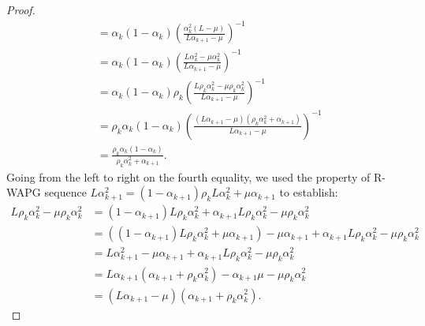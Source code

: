 \documentclass[12pt]{article}
\begin{document}
\begin{proof}
\begin{align*}
                &= 
                \alpha_k(1 - \alpha_k)
                \left(
                    \frac{\alpha_k^2(L - \mu)}{L\alpha_{k + 1} - \mu}
                \right)^{-1}
                \\
                &= \alpha_k(1 - \alpha_k)
                \left(
                    \frac{L\alpha_k^2 - \mu\alpha_k^2}{L\alpha_{k + 1} - \mu}
                \right)^{-1}
                \\
                &= 
                \alpha_k(1 - \alpha_k)
                \rho_k\left(
                    \frac{L\rho_k\alpha_k^2 - \mu\rho_k\alpha_k^2}{L\alpha_{k + 1} - \mu}
                \right)^{-1}
                \\
                &= 
                \rho_k\alpha_k(1 - \alpha_k)
                \left(
                    \frac{(L\alpha_{k + 1} - \mu)(\rho_k\alpha_k^2 + \alpha_{k + 1})}
                    {L\alpha_{k + 1} - \mu}
                \right)^{-1}
                \\
                &= \frac{\rho_k\alpha_k(1 - \alpha_k)}{\rho_k\alpha_k^2 + \alpha_{k + 1}}.
            \end{align*}
            Going from the left to right on the fourth equality, we used the property of R-WAPG sequence $L\alpha_{k + 1}^2 = (1 - \alpha_{k + 1})\rho_kL\alpha_k^2 + \mu \alpha_{k + 1}$ to establish: 
            \begin{align*}
                L \rho_k \alpha_k^2 - \mu \rho_k \alpha_k^2 
                &= 
                (1 - \alpha_{k + 1})L \rho_k \alpha_k^2 + \alpha_{k + 1} L \rho_k \alpha_k^2 - \mu \rho_k \alpha_k^2
                \\
                &= 
                ((1 - \alpha_{k + 1})L \rho_k \alpha_k^2 + \mu \alpha_{k + 1}) - \mu\alpha_{k + 1} + \alpha_{k + 1} L \rho_k \alpha_k^2 - \mu \rho_k \alpha_k^2
                \\
                &= L \alpha_{k + 1}^2 - \mu\alpha_{k + 1} + \alpha_{k + 1}L\rho_k\alpha_k^2 - \mu \rho_k \alpha_k^2
                \\
                &= 
                L\alpha_{k + 1}(\alpha_{k + 1} + \rho_k \alpha_k^2) - \alpha_{k + 1}\mu - \mu \rho_k \alpha_k^2
                \\
                &= (L \alpha_{k + 1} - \mu)(\alpha_{k + 1} + \rho_k \alpha_k^2). 
            \end{align*}

\end{proof}
\end{document}
